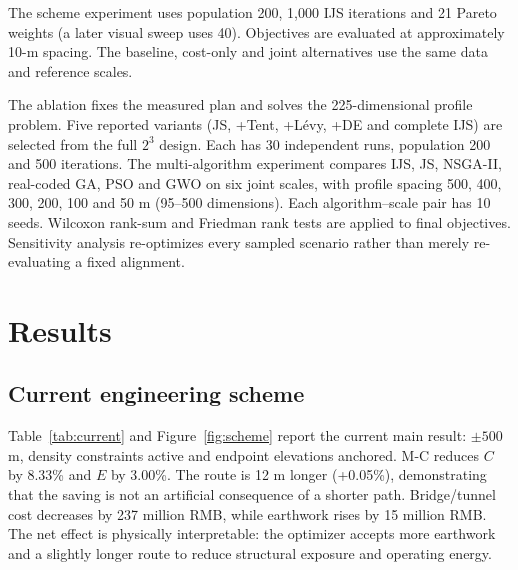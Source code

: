 \documentclass[preprint,12pt]{elsarticle}
\begin{document}
The scheme experiment uses population 200, 1,000 IJS iterations and 21 Pareto weights (a later visual sweep uses 40). Objectives are evaluated at approximately 10-m spacing. The baseline, cost-only and joint alternatives use the same data and reference scales.

The ablation fixes the measured plan and solves the 225-dimensional profile problem. Five reported variants (JS, +Tent, +L\'evy, +DE and complete IJS) are selected from the full $2^3$ design. Each has 30 independent runs, population 200 and 500 iterations. The multi-algorithm experiment compares IJS, JS, NSGA-II, real-coded GA, PSO and GWO on six joint scales, with profile spacing 500, 400, 300, 200, 100 and 50 m (95--500 dimensions). Each algorithm--scale pair has 10 seeds. Wilcoxon rank-sum and Friedman rank tests \cite{wilcoxon1945,friedman1937} are applied to final objectives. Sensitivity analysis re-optimizes every sampled scenario rather than merely re-evaluating a fixed alignment.

\section{Results}

\subsection{Current engineering scheme}

Table~\ref{tab:current} and Figure~\ref{fig:scheme} report the current main result: $\pm500$ m, density constraints active and endpoint elevations anchored. M-C reduces $C$ by 8.33\% and $E$ by 3.00\%. The route is 12 m longer (+0.05\%), demonstrating that the saving is not an artificial consequence of a shorter path. Bridge/tunnel cost decreases by 237 million RMB, while earthwork rises by 15 million RMB. The net effect is physically interpretable: the optimizer accepts more earthwork and a slightly longer route to reduce structural exposure and operating energy.
\end{document}
